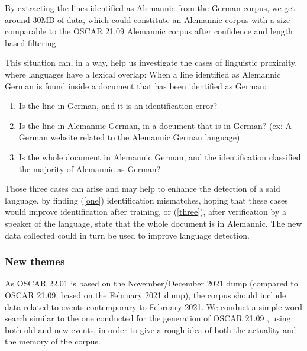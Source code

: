 By extracting the lines identified as Alemannic from the German corpus, we get around 30MB of data, which could constitute an Alemannic corpus with a size comparable to the OSCAR 21.09 Alemannic corpus after confidence and length based filtering.


This situation can, in a way, help us investigate the cases of linguistic proximity, where languages have a lexical overlap: When a line identified as Alemannic German is found inside a document that has been identified as German:
\begin{enumerate}
    \item \label{one} Is the line in German, and it is an identification error?
    \item Is the line in Alemannic German, in a document that is in German? (ex: A German website related to the Alemannic German language)
    \item \label{three} Is the whole document in Alemannic German, and the identification classified the majority of Alemannic as German?
\end{enumerate}

Those three cases can arise and may help to enhance the detection of a said language, by finding (\ref{one}) identification mismatches, hoping that these cases would improve identification after training, or (\ref{three}), after verification by a speaker of the language, state that the whole document is in Alemannic. The new data collected could in turn be used to improve language detection.

\subsubsection{New themes}

As OSCAR 22.01 is based on the November/December 2021 dump (compared to OSCAR 21.09, based on the February 2021 dump), the corpus should include data related to events contemporary to February 2021. We conduct a simple word search similar to the one conducted for the generation of OSCAR 21.09 \cite{abadji-etal-2021-ungoliant}, using both old and new events, in order to give a rough idea of both the actuality and the memory of the corpus.

